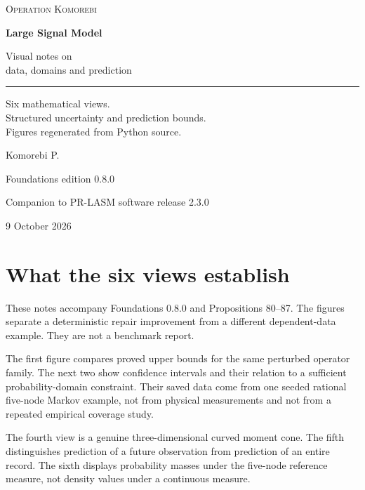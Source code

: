 \documentclass[11pt,letterpaper]{article}
\begin{document}
\hypersetup{pageanchor=false}
\begin{titlepage}
\vspace*{0.5in}
{\small\textsc{Operation Komorebi}\par}
\vspace{0.72in}
{\fontsize{33}{39}\selectfont\bfseries Large Signal Model\par}
\vspace{0.3in}
{\fontsize{21}{27}\selectfont Visual notes on\\data, domains and prediction\par}
\vspace{0.45in}
\rule{\textwidth}{0.45pt}\par
\vspace{0.3in}
\begin{minipage}{0.95\textwidth}
\large
Six mathematical views.\\Structured uncertainty and prediction bounds.\\Figures regenerated from Python source.
\end{minipage}
\vfill
{\Large Komorebi P.\par}
\vspace{0.2in}
{\normalsize Foundations edition 0.8.0\par}
{\normalsize Companion to PR-LASM software release 2.3.0\par}
{\normalsize 9 October 2026\par}
\end{titlepage}
\hypersetup{pageanchor=true}
\section{What the six views
establish}\label{what-the-six-views-establish}

These notes accompany Foundations 0.8.0 and Propositions 80--87. The
figures separate a deterministic repair improvement from a different
dependent-data example. They are not a benchmark report.

The first figure compares proved upper bounds for the same perturbed
operator family. The next two show confidence intervals and their
relation to a sufficient probability-domain constraint. Their saved data
come from one seeded rational five-node Markov example, not from
physical measurements and not from a repeated empirical coverage study.

The fourth view is a genuine three-dimensional curved moment cone. The
fifth distinguishes prediction of a future observation from prediction
of an entire record. The sixth displays probability masses under the
five-node reference measure, not density values under a continuous
measure.
\end{document}
